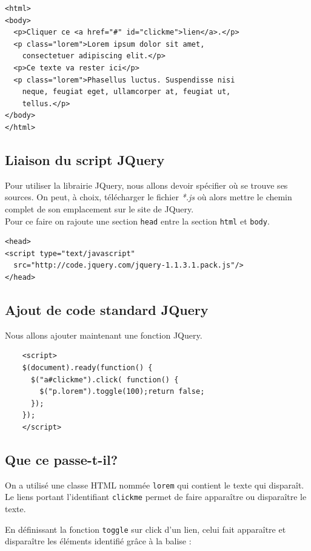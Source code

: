 \documentclass[10pt,a4paper,titlepage]{article}
\begin{document}
\begin{lstlisting}
<html>
<body>
  <p>Cliquer ce <a href="#" id="clickme">lien</a>.</p>
  <p class="lorem">Lorem ipsum dolor sit amet,
    consectetuer adipiscing elit.</p>
  <p>Ce texte va rester ici</p>
  <p class="lorem">Phasellus luctus. Suspendisse nisi
  	neque, feugiat eget, ullamcorper at, feugiat ut,
  	tellus.</p>
</body>
</html>
\end{lstlisting}

\subsection{Liaison du script JQuery}

Pour utiliser la librairie JQuery, nous allons devoir spécifier où se trouve ses sources. On peut, à choix, télécharger le fichier \emph{*.js} où alors mettre le chemin complet de son emplacement sur le site de JQuery. \\

Pour ce faire on rajoute une section \texttt{head} entre la section \texttt{html} et \texttt{body}.

\begin{lstlisting}
<head>
<script type="text/javascript"
  src="http://code.jquery.com/jquery-1.1.3.1.pack.js"/>
</head>
\end{lstlisting}

\subsection{Ajout de code standard JQuery}

Nous allons ajouter maintenant une fonction JQuery.

\begin{lstlisting}
	<script>
	$(document).ready(function() {
	  $("a#clickme").click( function() {
	    $("p.lorem").toggle(100);return false;
	  });
	});
	</script>
\end{lstlisting}

\subsection{Que ce passe-t-il?}

On a utilisé une classe HTML nommée \texttt{lorem} qui contient le texte qui disparaît. Le liens portant l'identifiant \texttt{clickme} permet de faire apparaître ou disparaître le texte. 

En définissant la fonction \texttt{toggle} sur click d'un lien, celui fait apparaître et  disparaître les éléments identifié grâce à la balise : 
\end{document}
